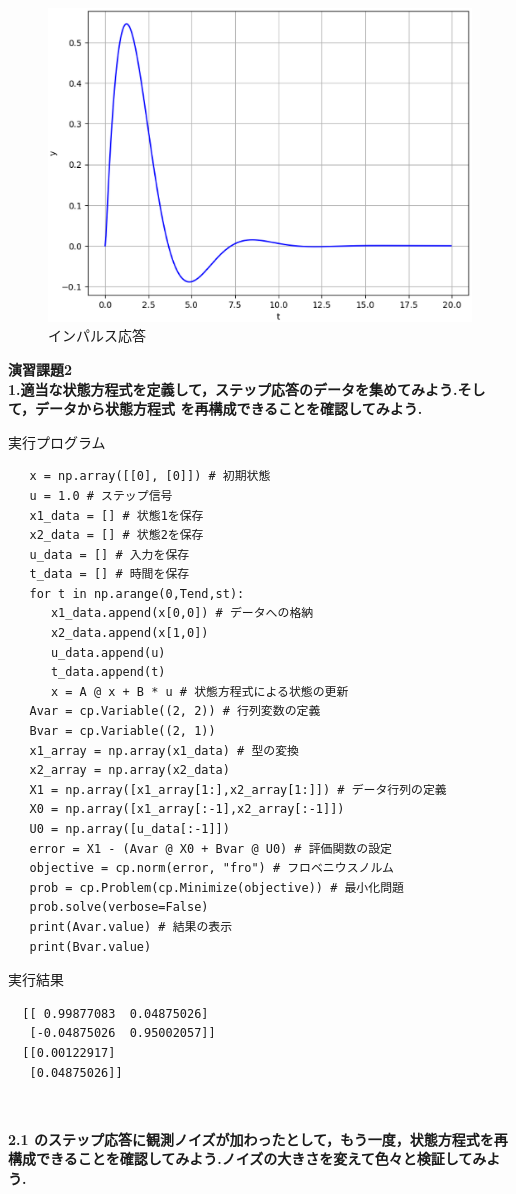 \documentclass[a4paper,10.5pt]{ltjsarticle}
\begin{document}
\begin{figure}[h]
  \centering
  \includegraphics[scale=0.5]{figure3.eps}
  \caption{インパルス応答}
\end{figure}

{\Large \bfseries 演習課題2}\\
{\large \bfseries 1.適当な状態方程式を定義して，ステップ応答のデータを集めてみよう.そして，データから状態方程式 を再構成できることを確認してみよう.}\\
\centerline{実行プログラム}
\begin{lstlisting}
   x = np.array([[0], [0]]) # 初期状態
   u = 1.0 # ステップ信号
   x1_data = [] # 状態1を保存
   x2_data = [] # 状態2を保存
   u_data = [] # 入力を保存
   t_data = [] # 時間を保存
   for t in np.arange(0,Tend,st):
      x1_data.append(x[0,0]) # データへの格納
      x2_data.append(x[1,0])
      u_data.append(u)
      t_data.append(t)
      x = A @ x + B * u # 状態方程式による状態の更新
   Avar = cp.Variable((2, 2)) # 行列変数の定義
   Bvar = cp.Variable((2, 1))
   x1_array = np.array(x1_data) # 型の変換
   x2_array = np.array(x2_data)
   X1 = np.array([x1_array[1:],x2_array[1:]]) # データ行列の定義
   X0 = np.array([x1_array[:-1],x2_array[:-1]])
   U0 = np.array([u_data[:-1]])
   error = X1 - (Avar @ X0 + Bvar @ U0) # 評価関数の設定
   objective = cp.norm(error, "fro") # フロベニウスノルム
   prob = cp.Problem(cp.Minimize(objective)) # 最小化問題
   prob.solve(verbose=False)
   print(Avar.value) # 結果の表示
   print(Bvar.value)
\end{lstlisting}
\centerline{実行結果}
\begin{lstlisting}
  [[ 0.99877083  0.04875026]
   [-0.04875026  0.95002057]]
  [[0.00122917]
   [0.04875026]]
\end{lstlisting}
\centerline{　}
{\large \bfseries 2.1 のステップ応答に観測ノイズが加わったとして，もう一度，状態方程式を再構成できることを確認してみよう.ノイズの大きさを変えて色々と検証してみよう.}\\
\end{document}
